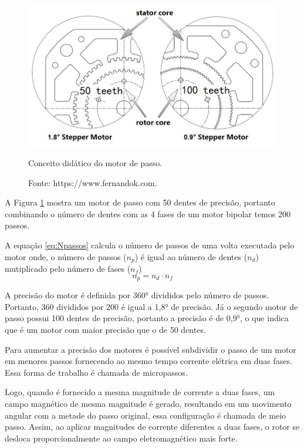 \begin{figure}[H]
\centering
\includegraphics[scale = 0.4]{figuras/didaticopasso}
\caption{Conceito didático do motor de passo.}
\caption*{Fonte: https://www.fernandok.com.}
\label{fig:didaticopasso}
\end{figure}
    
A Figura \ref{fig:didaticopasso} mostra um motor de passo com 50 dentes de precisão, portanto combinando 
o número de dentes com as 4 fases de um motor bipolar temos 200 passos. 

A equação \ref{eq:Npassos} calcula o número de passos de uma volta executada pelo motor onde,
o número de passos ($n_{p}$) é igual ao número de dentes ($n_{d}$) mutiplicado pelo número de fases ($n_{f}$)
\begin{equation}\label{eq:Npassos}
    n_{p} = n_{d} \cdot n_{f}
\end{equation}

A precisão do motor é definida por 360° divididos pelo número de passos. Portanto, 
360 divididos por 200 é igual a 1,8° de precisão. Já o segundo motor 
de passo possui 100 dentes de precisão, portanto a precisão é de 0,9°, o que indica que 
é um motor com maior precisão que o de 50 dentes.

Para aumentar a precisão dos motores é possível subdividir o passo de um motor em menores passos fornecendo 
ao mesmo tempo corrente elétrica em duas fases. Essa forma de trabalho é chamada de micropassos.

Logo, quando é fornecido a mesma magnitude de corrente a duas fases, um campo magnético de mesma magnitude 
é gerado, resultando em um movimento angular com a metade do passo original, essa configuração é chamada de 
meio passo. Assim, ao aplicar magnitudes de corrente diferentes a duas fases, o rotor se desloca 
proporcionalmente ao campo eletromagnético mais forte.

